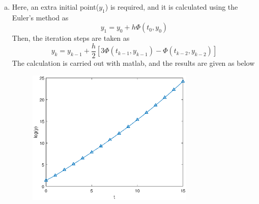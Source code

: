 \documentclass[paper=a4, fontsize=11pt]{scrartcl} %
\numberwithin{equation}{section} %
\numberwithin{figure}{section} %
\numberwithin{table}{section} %
\begin{document}
\begin{enumerate}[(a)]
\begin{figure}[!htbp]
			\end{figure}
		\item 
			Here, an extra initial point($y_1$) is required, and it is calculated using the Euler's method as
			\begin{equation}
				y_1 = y_0 + h \Phi(t_0, y_0)
			\end{equation}
			Then, the iteration steps are taken as
			\begin{equation}
				y_k = y_{k-1} + \frac{h}{2}[3\Phi(t_{k-1}, y_{k-1}) - \Phi(t_{k-2}, y_{k-2})]
			\end{equation}
			The calculation is carried out with matlab, and the results are given as below
			\begin{figure}[!htbp]
				\centering
				\includegraphics[width=8cm]{../pic/Q3_e.eps}
			\end{figure}
			
	\end{enumerate}
\end{document}
